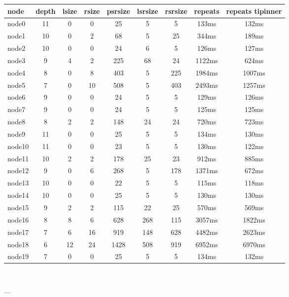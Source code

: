 

\begin{tabular}{|l|c|c|c|c|c|c|c|c|}
\hline node & depth & lsize & rsize & psrsize & lsrsize & rsrsize   & repeats & repeats tipinner\\
    \hline node0 & 11 & 0 & 0 & 25 & 5 & 5 & 133ms & 132ms\\
    \hline node1 & 10 & 0 & 2 & 68 & 5 & 25 & 344ms & 189ms\\
    \hline node2 & 10 & 0 & 0 & 24 & 6 & 5 & 126ms & 127ms\\
    \hline node3 & 9 & 4 & 2 & 225 & 68 & 24 & 1122ms & 624ms\\
    \hline node4 & 8 & 0 & 8 & 403 & 5 & 225 & 1984ms & 1007ms\\
    \hline node5 & 7 & 0 & 10 & 508 & 5 & 403 & 2493ms & 1257ms\\
    \hline node6 & 9 & 0 & 0 & 24 & 5 & 5 & 129ms & 126ms\\
    \hline node7 & 9 & 0 & 0 & 24 & 5 & 5 & 125ms & 125ms\\
    \hline node8 & 8 & 2 & 2 & 148 & 24 & 24 & 720ms & 723ms\\
    \hline node9 & 11 & 0 & 0 & 25 & 5 & 5 & 134ms & 130ms\\
    \hline node10 & 11 & 0 & 0 & 23 & 5 & 5 & 130ms & 122ms\\
    \hline node11 & 10 & 2 & 2 & 178 & 25 & 23 & 912ms & 885ms\\
    \hline node12 & 9 & 0 & 6 & 268 & 5 & 178 & 1371ms & 672ms\\
    \hline node13 & 10 & 0 & 0 & 22 & 5 & 5 & 115ms & 118ms\\
    \hline node14 & 10 & 0 & 0 & 25 & 5 & 5 & 130ms & 130ms\\
    \hline node15 & 9 & 2 & 2 & 115 & 22 & 25 & 570ms & 569ms\\
    \hline node16 & 8 & 8 & 6 & 628 & 268 & 115 & 3057ms & 1822ms\\
    \hline node17 & 7 & 6 & 16 & 919 & 148 & 628 & 4482ms & 2623ms\\
    \hline node18 & 6 & 12 & 24 & 1428 & 508 & 919 & 6952ms & 6970ms\\
    \hline node19 & 7 & 0 & 0 & 25 & 5 & 5 & 134ms & 132ms\\

\hline
\end{tabular} \

---



